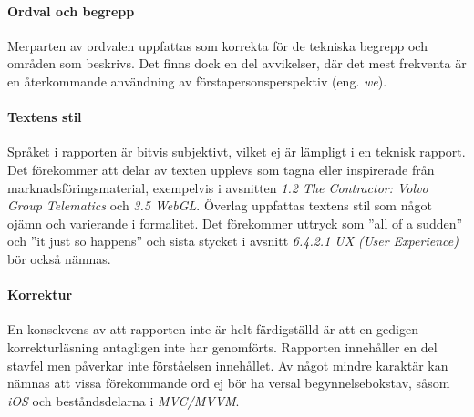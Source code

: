     \paragraph{Ordval och begrepp}
        Merparten av ordvalen uppfattas som korrekta för de tekniska begrepp och områden som beskrivs. Det finns dock en del avvikelser, där det mest frekventa är en återkommande användning av förstapersonsperspektiv (eng. \emph{we}). 

    \paragraph{Textens stil}
        Språket i rapporten är bitvis subjektivt, vilket ej är lämpligt i en teknisk rapport. Det förekommer att delar av texten upplevs som tagna eller inspirerade från marknadsföringsmaterial, exempelvis i avsnitten \emph{1.2 The Contractor: Volvo Group Telematics} och \emph{3.5 WebGL}. Överlag uppfattas textens stil som något ojämn och varierande i formalitet. Det förekommer uttryck som ''all of a sudden'' och ''it just so happens'' och sista stycket i avsnitt \emph{6.4.2.1 UX (User Experience)} bör också nämnas.

    \paragraph{Korrektur}
        En konsekvens av att rapporten inte är helt färdigställd är att en gedigen korrekturläsning antagligen inte har genomförts. Rapporten innehåller en del stavfel men påverkar inte förståelsen innehållet. Av något mindre karaktär kan nämnas att vissa förekommande ord ej bör ha versal begynnelsebokstav, såsom \emph{iOS} och beståndsdelarna i \emph{MVC/MVVM}.


